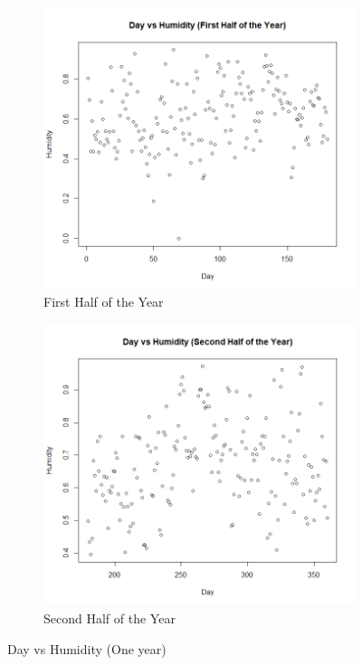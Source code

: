 \documentclass[12pt]{article}
\begin{document}
\begin{figure} [!h]
\centering
\begin{subfigure}{.5\textwidth}
  \centering
  \includegraphics[width=1.05\linewidth]{DvsH1half.png}
  \caption{First Half of the Year}
  \label{fig:1half}
\end{subfigure}%
\begin{subfigure}{.5\textwidth}
  \centering
  \includegraphics[width=1.05\linewidth]{DvsH2half.png}
  \caption{Second Half of the Year}
  \label{fig:2half}
\end{subfigure}
\caption{Day vs Humidity (One year)}
\label{fig:year}
\end{figure}
\end{document}

